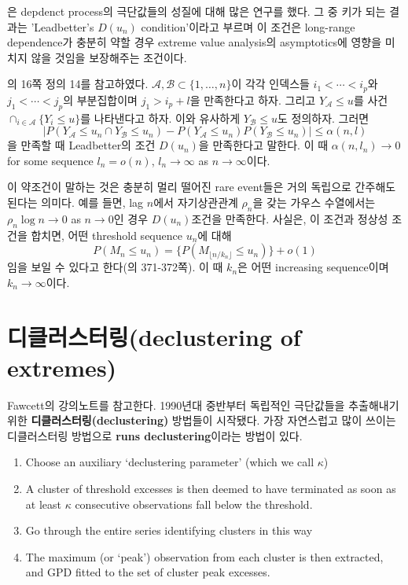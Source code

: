 \documentclass[b5paper,]{scrbook}
\theoremstyle{plain}
\theoremstyle{definition}
\numberwithin{equation}{section}
\let\BeginKnitrBlock\begin \let\EndKnitrBlock\end
\begin{document}
\citep{Leadbetter1983}은 depdenct process의 극단값들의 성질에 대해 많은 연구를 했다. 그 중 키가 되는 결과는 'Leadbetter's \(D(u_{n})\) condition'이라고 부르며 이 조건은 long-range dependence가 충분히 약할 경우 extreme value analysis의 asymptotics에 영향을 미치지 않을 것임을 보장해주는 조건이다.

\BeginKnitrBlock{definition}[Leadbetter의 조건]
\protect\hypertarget{def:unnamed-chunk-455}{}{\label{def:unnamed-chunk-455} {} }\citep{Huser2013}의 16쪽 정의 14를 참고하였다. \(\mathcal{A}, \mathcal{B} \subset \{ 1, \ldots, n\}\)이 각각 인덱스들 \(i_{1} < \cdots < i_{p}\)와 \(j_{1} < \cdots <j_{p}\)의 부분집합이며 \(j_{1} > i_{p}+l\)을 만족한다고 하자. 그리고 \(Y_{\mathcal{A}}\leq u\)를 사건 \(\cap_{i\in\mathcal{A}}\{Y_{i}\leq u\}\)를 나타낸다고 하자. 이와 유사하게 \(Y_{\mathcal{B}}\leq u\)도 정의하자. 그러면
\[|P(Y_{\mathcal{A}} \leq u_{n} \cap Y_{\mathcal{B}} \leq u_{n}) - P(Y_{\mathcal{A}} \leq u_{n})P(Y_{\mathcal{B}} \leq u_{n})  | \leq \alpha(n,l)\]
을 만족할 때 Leadbetter의 조건 \(D(u_{n})\)을 만족한다고 말한다. 이 때 \(\alpha(n,l_{n})\rightarrow 0\) for some sequence \(l_{n}=o(n)\), \(l_{n}\rightarrow \infty\) as \(n \rightarrow\infty\)이다.
\EndKnitrBlock{definition}

이 약조건이 말하는 것은 충분히 멀리 떨어진 rare event들은 거의 독립으로 간주해도 된다는 의미다. 예를 들면, lag \(n\)에서 자기상관관계 \(\rho_{n}\)을 갖는 가우스 수열에서는 \(\rho_{n}\log n \rightarrow 0\) as \(n\rightarrow 0\)인 경우 \citep{Beirlant2004} \(D(u_{n})\)조건을 만족한다. 사실은, 이 조건과 정상성 조건을 합치면, 어떤 threshold sequence \(u_{n}\)에 대해
\[P(M_{n}\leq u_{n} ) = \{ P(M_{\lfloor n/k_{n}\rfloor} \leq u_{n}) \} + o(1)\]
임을 보일 수 있다고 한다(\citep{Beirlant2004}의 371-372쪽). 이 때 \(k_{n}\)은 어떤 increasing sequence이며 \(k_{n}\rightarrow \infty\)이다.

\hypertarget{declustering-of-extremes}{%
\section{디클러스터링(declustering of extremes)}\label{declustering-of-extremes}}

Fawcett의 강의노트를 참고한다. 1990년대 중반부터 독립적인 극단값들을 추출해내기 위한 \textbf{디클러스터링(declustering)} 방법들이 시작됐다. 가장 자연스럽고 많이 쓰이는 디클러스터링 방법으로 \textbf{runs declustering}이라는 방법이 있다.

\begin{enumerate}
\def\labelenumi{\arabic{enumi}.}
\item
  Choose an auxiliary `declustering parameter' (which we call \(\kappa\))
\item
  A cluster of threshold excesses is then deemed to have terminated as soon as at least \(\kappa\) consecutive observations fall below the threshold.
\item
  Go through the entire series identifying clusters in this way
\item
  The maximum (or `peak') observation from each cluster is then extracted, and GPD fitted to the set of cluster peak excesses.
\end{enumerate}
\end{document}
